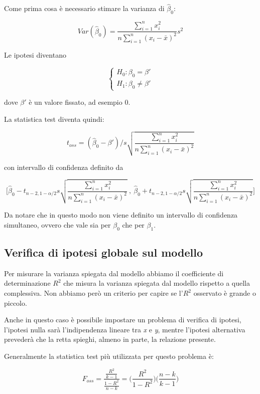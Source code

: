 Come prima cosa è necessario stimare la varianza di $ \hat{\beta}_0 $:

$$
Var(\hat{\beta}_0) = \frac{\sum_{i=1}^{n} x_{i}^2}{n \sum_{i=1}^{n} (x_i - \bar{x})^2}s^2
$$

Le ipotesi diventano

$$
\begin{cases}
H_0 : \beta_0 = \beta' \\
H_1 : \beta_0 \neq \beta' 
\end{cases}
$$

dove $ \beta' $ è un valore fissato, ad esempio 0.

La statistica test diventa quindi:

$$
t_{oss}  = (\hat{\beta}_0 - \beta') \Bigg/ s \sqrt{\frac{\sum_{i=1}^{n} x_{i}^2}{n \sum_{i=1}^{n} (x_i - \bar{x})^2}}
$$

con intervallo di confidenza definito da

$$
\Bigg[ \hat{\beta}_0 - t_{n-2, 1-\alpha/2} s \sqrt{\frac{\sum_{i=1}^{n} x_{i}^2}{n \sum_{i=1}^{n} (x_i - \bar{x})^2}} \:,\: \hat{\beta}_0 + t_{n-2, 1-\alpha/2} s \sqrt{\frac{\sum_{i=1}^{n} x_{i}^2}{n \sum_{i=1}^{n} (x_i - \bar{x})^2}}\Bigg]
$$

Da notare che in questo modo non viene definito un intervallo di confidenza simultaneo, ovvero che vale sia per $ \beta_0 $ che per $ \beta_1 $.


\subsection{Verifica di ipotesi globale sul modello}\label{verifica-di-ipotesi-globale-sul-modello}

Per misurare la varianza spiegata dal modello abbiamo il coefficiente di
determinazione $R^2$ che misura la varianza spiegata dal modello
rispetto a quella complessiva. Non abbiamo però un criterio per capire
se l'$R^{2}$ osservato è grande o piccolo.

Anche in questo caso è possibile impostare un problema di verifica di
ipotesi, l'ipotesi nulla sarà l'indipendenza lineare tra \emph{x} e
\emph{y}, mentre l'ipotesi alternativa prevederà che la retta spieghi,
almeno in parte, la relazione presente.

Generalmente la statistica test più utilizzata per questo problema è:

$$
F_{oss} = \frac{\frac{R^2}{k -1}}{\frac{1-R^2}{n-k}} = \Bigg( \frac{R^2}{1-R^2} \Bigg) \Bigg( \frac{n-k}{k-1}\Bigg)
$$

